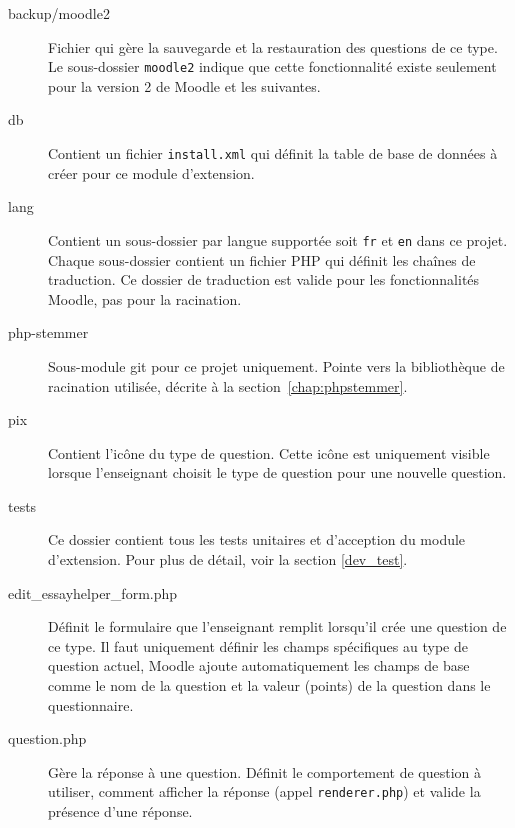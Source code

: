 \begin{description}
 \item[backup/moodle2]
 Fichier qui g\`ere la sauvegarde et la restauration des questions de ce type.
 Le sous-dossier \texttt{moodle2} indique que cette fonctionnalit\'e existe seulement pour la version 2 de Moodle et les suivantes.
 
 \item[db]
 
 Contient un fichier \texttt{install.xml} qui d\'efinit la table de base de donn\'ees \`a cr\'eer pour ce module d'extension.
 
 \item[lang]
 
 Contient un sous-dossier par langue support\'ee soit \texttt{fr} et \texttt{en} dans ce projet.
 Chaque sous-dossier contient un fichier PHP qui d\'efinit les cha\^ines de traduction.
 Ce dossier de traduction est valide pour les fonctionnalit\'es Moodle, pas pour la racination.
 
 \item[php-stemmer]
 
 Sous-module git pour ce projet uniquement.
 Pointe vers la biblioth\`eque de racination utilis\'ee,  d\'ecrite \`a la section~\ref{chap:phpstemmer}.
 
 \item[pix]
 
 Contient l'ic\^one du type de question.
 Cette ic\^one est uniquement visible lorsque l'enseignant choisit le type de question pour une nouvelle question.
 
 \item[tests]
 
 Ce dossier contient tous les tests unitaires et d'acception du module d'extension.
 Pour plus de d\'etail, voir la section \ref{dev_test}.
 
 \item[edit\_essayhelper\_form.php]
 
 D\'efinit le formulaire que l'enseignant remplit lorsqu'il cr\'ee une question de ce type.
 Il faut uniquement d\'efinir les champs sp\'ecifiques au type de question actuel, Moodle ajoute automatiquement les champs de base comme le nom de la question et la valeur (points) de la question dans le questionnaire.
 
 \item[question.php]
 
 G\`ere la r\'eponse \`a une question.
 D\'efinit le comportement de question \`a utiliser, comment afficher la r\'eponse (appel \texttt{renderer.php}) et valide la pr\'esence d'une r\'eponse.
 

\end{description}
